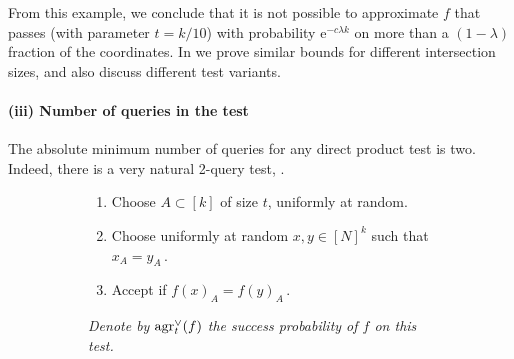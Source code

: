 \documentclass[11pt]{article}
\numberwithin{equation}{section}
\theoremstyle{definition}
\theoremstyle{plain}
\newcommand{\eee}{\mathrm e}
\newcommand\f{f} %
\newcommand{\test}[2]{
	\ifx &#2&
	\textrm{agr}^{#1}
	\else	
	\textrm{agr}^{#1}_{#2}
	\fi}
\begin{document}
From this example, we conclude that it is not possible to approximate $\f$ that passes  (with parameter $t=k/10$) with probability $\eee^{-c\lambda k}$ on more than %
a $(1-\lambda)$ fraction   %
of the coordinates. In  we prove similar bounds for different intersection sizes, and also discuss different test variants.

\paragraph*{(iii) Number of queries in the test}
The absolute %
%
minimum  %
number of queries for any direct product test is two. Indeed, there is a very natural 2-query test, .
\begin{figure}
%
\label{test:2 query test}
	\centering
	\begin{subfigure}{0.58\textwidth}
		\begin{enumerate}
			\item Choose $A\subset[k]$ of size $t$, uniformly at random.
			\item Choose uniformly at random $x,y\in[N]^k$ such that $x_A = y_A$\,.
			\item Accept if $\f(x)_A = \f(y)_A$\,.
		\end{enumerate}
	\end{subfigure}
	\hfill
%
	\begin{subfigure}{0.4\textwidth}
		\centering
	\end{subfigure}
	\vspace{2pt}
%
	\begin{subfigure}{\textwidth}
		\vspace{5pt}
		\emph{Denote by $\test{\vee}{t}(f)$ the success probability of $\f$ on this test.}
	\end{subfigure}
\end{figure}
\end{document}
